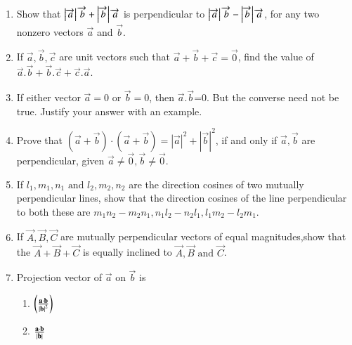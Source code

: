 \begin{enumerate}[label=\thesubsection.\arabic*,ref=\thesubsection.\theenumi]
	\\
	\solution
		
\item Show that $\left\vert\overrightarrow {a}\right\vert\overrightarrow {b}+\left\vert\overrightarrow {b}\right\vert\overrightarrow {a}$ is perpendicular to $\left\vert\overrightarrow {a}\right\vert \overrightarrow {b}-\left\vert\overrightarrow {b}\right\vert \overrightarrow {a}$, for any two nonzero vectors $\overrightarrow {a}$ and $\overrightarrow {b}$.
	\\
	\solution
		
\item If $\overrightarrow {a},\overrightarrow {b},\overrightarrow {c}$ are unit vectors such that $\overrightarrow {a}+\overrightarrow {b}+\overrightarrow {c}=\overrightarrow {0}$, find the value of $\overrightarrow {a}.\overrightarrow {b}+\overrightarrow {b}.\overrightarrow {c}+\overrightarrow {c}.\overrightarrow {a}$.
	\\
	\solution
		
\item If either vector $\overrightarrow {a}=0$ or $\overrightarrow {b}=0$, then $\overrightarrow {a}.\overrightarrow {b}$=0. But the converse need not be true. Justify your answer with an example.
	\\
	\solution
		
\item Prove that $(\vec{a}+\vec{b})\cdot(\vec{a}+\vec{b})=|{\vec{a}}|^2+|{\vec{b}}|^2$, if and only if $\vec{a}, \vec{b}$ are perpendicular, given $\vec{a}\neq\vec{0}, \vec{b}\neq\vec{0}$.\\
	\solution
		
	\item  If $l_1, m_1,n_1 \text{ and } l_2,m_2,n_2$ are the direction cosines of two mutually perpendicular lines, show that the direction cosines of the line perpendicular to both these are  $m_1n_2-m_2n_1,n_1l_2-n_2l_1,l_1m_2-l_2m_1$.
\\
    \solution
		
    \item If $ \vec{A},\vec{B},\vec{C} $ are mutually perpendicular vectors of equal magnitudes,show that the  $ \vec{A}+\vec{B}+\vec{C} $ is equally inclined to $ \vec{A},\vec{B}  \text{ and }  \vec{C} $.
\item Projection vector of $\vec{a}$ on $\vec{b}$ is
	\begin{enumerate}
\item $\left(\frac{\mathbf{a}\cdot\mathbf{b}}{\left\vert\mathbf{b}\right\vert^2}\right)$
\item $\frac{\mathbf{a}\cdot\mathbf{b}}{\left\vert\mathbf{b}\right\vert}$

\end{enumerate}
\end{enumerate}
